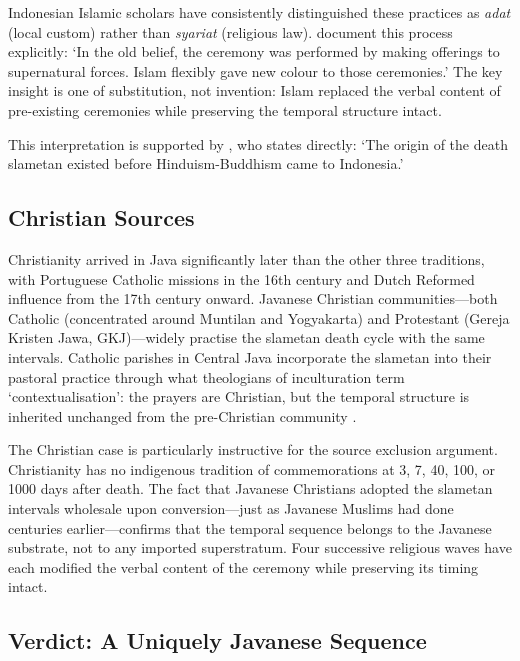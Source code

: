\documentclass[12pt,a4paper]{article}
\begin{document}
Indonesian Islamic scholars have consistently distinguished these practices as \textit{adat} (local custom) rather than \textit{syariat} (religious law). \citet[441]{hendrajaya_2020} document this process explicitly: `In the old belief, the ceremony was performed by making offerings to supernatural forces. Islam flexibly gave new colour to those ceremonies.' The key insight is one of substitution, not invention: Islam replaced the verbal content of pre-existing ceremonies while preserving the temporal structure intact.

This interpretation is supported by \citet[149]{aizid_2015}, who states directly: `The origin of the death slametan existed before Hinduism-Buddhism came to Indonesia.'

\subsection{Christian Sources}

Christianity arrived in Java significantly later than the other three traditions, with Portuguese Catholic missions in the 16th century and Dutch Reformed influence from the 17th century onward. Javanese Christian communities---both Catholic (concentrated around Muntilan and Yogyakarta) and Protestant (Gereja Kristen Jawa, GKJ)---widely practise the slametan death cycle with the same intervals. Catholic parishes in Central Java incorporate the slametan into their pastoral practice through what theologians of inculturation term `contextualisation': the prayers are Christian, but the temporal structure is inherited unchanged from the pre-Christian community \citep{aritonang_steenbrink_2008}.

The Christian case is particularly instructive for the source exclusion argument. Christianity has no indigenous tradition of commemorations at 3, 7, 40, 100, or 1000 days after death. The fact that Javanese Christians adopted the slametan intervals wholesale upon conversion---just as Javanese Muslims had done centuries earlier---confirms that the temporal sequence belongs to the Javanese substrate, not to any imported superstratum. Four successive religious waves have each modified the verbal content of the ceremony while preserving its timing intact.

\subsection{Verdict: A Uniquely Javanese Sequence}
\end{document}
